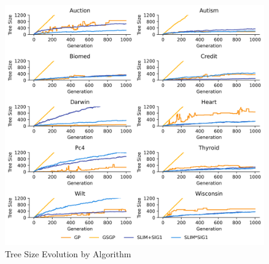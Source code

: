 
    \begin{figure}[H]
    \centering
    \includegraphics[width=\linewidth]{../Latex/Chapters/Figures/Results/comparison_tree_size_evolution.png}
    \caption{Tree Size Evolution by Algorithm}
    \label{fig:comparison_tree_size_evolution}
    \end{figure}
    